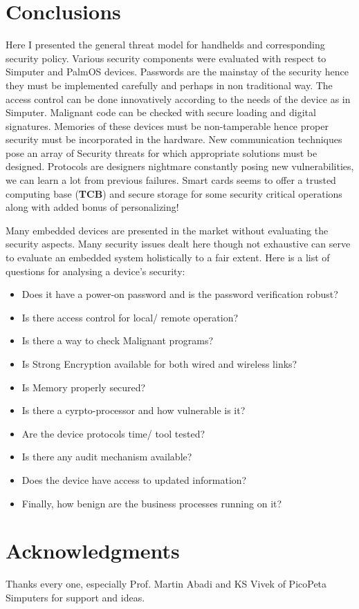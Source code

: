 \documentclass[11pt]{article}
\begin{document}
\section{Conclusions}
Here I presented the general threat model for handhelds and corresponding security policy. Various security components were evaluated with respect to Simputer and PalmOS devices. Passwords are the mainstay of the security hence they must be implemented carefully and perhaps in non traditional way. The access control can be done innovatively according to the needs of the device as in Simputer. Malignant code can be checked with secure loading and digital signatures. Memories of these devices must be  non-tamperable hence proper security must be incorporated in the hardware. New communication techniques pose an array of Security threats for which appropriate solutions must be designed. Protocols are designers nightmare constantly posing new vulnerabilities, we can learn a lot from previous failures. Smart cards seems to offer a trusted computing base ({\bf TCB}) and secure storage for some security critical operations along with added bonus of personalizing!

Many embedded devices are presented in the market without evaluating the security aspects. Many security issues dealt here though not exhaustive can serve to evaluate an embedded system holistically to a fair extent. Here is a list of questions for analysing a device's security:
\begin{itemize}\addtolength{\itemsep}{-0.5\baselineskip}
\item Does it have a power-on password and is the password verification robust?
\item Is there access control for local/ remote operation?
\item Is there a way to check Malignant programs?
\item Is Strong Encryption available for both wired and wireless links?
\item Is Memory properly secured?
\item Is there a cyrpto-processor and how vulnerable is it?
\item Are the device protocols time/ tool tested?
\item Is there any audit mechanism available?
\item Does the device have access to updated information?
\item Finally, how benign are the business processes running on it?
\end{itemize}

\section {Acknowledgments}
Thanks every one, especially Prof. Martin Abadi and KS Vivek of PicoPeta Simputers for support and ideas.

\pagebreak[4]

\end{document}
